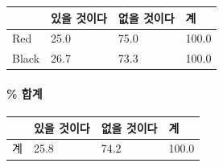 \documentclass[
]{article}
\begin{document}
\begin{longtable}[]{@{}llll@{}}
\toprule
& 있을 것이다 & 없을 것이다 & 계\tabularnewline
\midrule
\endhead
Red & 25.0 & 75.0 & 100.0\tabularnewline
Black & 26.7 & 73.3 & 100.0\tabularnewline
\bottomrule
\end{longtable}

\hypertarget{uxd569uxacc4}{%
\paragraph{\% 합계}\label{uxd569uxacc4}}

\begin{longtable}[]{@{}llll@{}}
\toprule
& 있을 것이다 & 없을 것이다 & 계\tabularnewline
\midrule
\endhead
계 & 25.8 & 74.2 & 100.0\tabularnewline
\bottomrule
\end{longtable}
\end{document}

